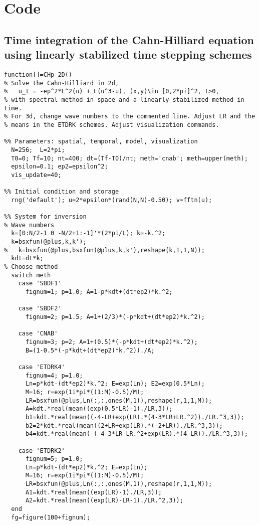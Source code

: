 \chapter{Code}
\section{Time integration of the Cahn-Hilliard equation using linearly stabilized time stepping schemes}
\begin{verbatim}
function[]=CHp_2D()
% Solve the Cahn-Hilliard in 2d,
%   u_t = -ep^2*L^2(u) + L(u^3-u), (x,y)\in [0,2*pi]^2, t>0,
% with spectral method in space and a linearly stabilized method in time.
% For 3d, change wave numbers to the commented line. Adjust LR and the
% means in the ETDRK schemes. Adjust visualization commands.

%% Parameters: spatial, temporal, model, visualization
  N=256;  L=2*pi;
  T0=0; Tf=10; nt=400; dt=(Tf-T0)/nt; meth='cnab'; meth=upper(meth);
  epsilon=0.1; ep2=epsilon^2; 
  vis_update=40;

%% Initial condition and storage
  rng('default'); u=2*epsilon*(rand(N,N)-0.50); v=fftn(u);
  
%% System for inversion
% Wave numbers
  k=[0:N/2-1 0 -N/2+1:-1]'*(2*pi/L); k=-k.^2; 
  k=bsxfun(@plus,k,k'); 
%   k=bsxfun(@plus,bsxfun(@plus,k,k'),reshape(k,1,1,N));
  kdt=dt*k;
% Choose method
  switch meth
    case 'SBDF1'
      fignum=1; p=1.0; A=1-p*kdt+(dt*ep2)*k.^2;
      
    case 'SBDF2'
      fignum=2; p=1.5; A=1+(2/3)*(-p*kdt+(dt*ep2)*k.^2);
      
    case 'CNAB'
      fignum=3; p=2; A=1+(0.5)*(-p*kdt+(dt*ep2)*k.^2); 
      B=(1-0.5*(-p*kdt+(dt*ep2)*k.^2))./A;
      
    case 'ETDRK4'
      fignum=4; p=1.0; 
      Ln=p*kdt-(dt*ep2)*k.^2; E=exp(Ln); E2=exp(0.5*Ln);
      M=16; r=exp(1i*pi*((1:M)-0.5)/M);
      LR=bsxfun(@plus,Ln(:,:,ones(M,1)),reshape(r,1,1,M));
      A=kdt.*real(mean((exp(0.5*LR)-1)./LR,3));
      b1=kdt.*real(mean((-4-LR+exp(LR).*(4-3*LR+LR.^2))./LR.^3,3));
      b2=2*kdt.*real(mean((2+LR+exp(LR).*(-2+LR))./LR.^3,3));
      b4=kdt.*real(mean( (-4-3*LR-LR.^2+exp(LR).*(4-LR))./LR.^3,3));
  
    case 'ETDRK2'
      fignum=5; p=1.0;
      Ln=p*kdt-(dt*ep2)*k.^2; E=exp(Ln); 
      M=16; r=exp(1i*pi*((1:M)-0.5)/M);
      LR=bsxfun(@plus,Ln(:,:,ones(M,1)),reshape(r,1,1,M));
      A1=kdt.*real(mean((exp(LR)-1)./LR,3));
      A2=kdt.*real(mean((exp(LR)-LR-1)./LR.^2,3)); 
  end
  fg=figure(100+fignum);
  

\end{verbatim}
